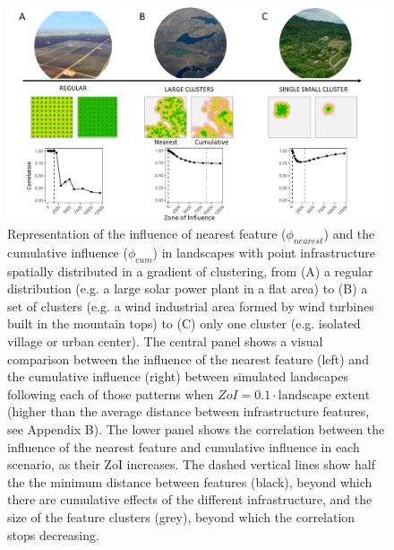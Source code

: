 \documentclass[titlepage]{article}
\begin{document}
\begin{figure}[h]
\centering
\includegraphics[width=1.3\textwidth,center]{figures/simulated_landscapes.png}
\caption{\label{fig:simulated_landscapes} Representation of the influence of nearest feature ($\phi_{nearest}$) and the cumulative influence ($\phi_{cum}$) in landscapes with point infrastructure spatially distributed in a gradient of clustering, from (A) a regular distribution (e.g. a large solar power plant in a flat area) to (B) a set of clusters (e.g. a wind industrial area formed by wind turbines built in the mountain tops) to (C) only one cluster (e.g. isolated village or urban center). The central panel shows  a visual comparison between the influence of the nearest feature (left) and the cumulative influence (right) between simulated landscapes following each of those patterns when $ZoI = 0.1 \cdot \text{landscape extent}$ (higher than the average distance between infrastructure features, see Appendix B). The lower panel shows the correlation between the influence of the nearest feature and cumulative influence in each scenario, as their ZoI increases. The dashed vertical lines show half the the minimum distance between features (black), beyond which there are cumulative effects of the different infrastructure, and the size of the feature clusters (grey), beyond which the correlation stops decreasing.}
\end{figure}
\end{document}

